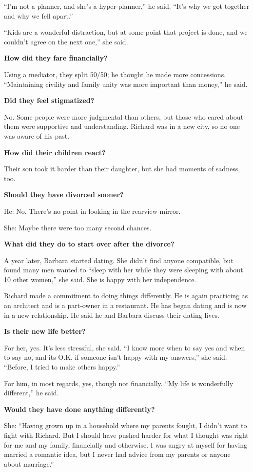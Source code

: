 ``I'm not a planner, and she's a hyper-planner,'' he said. ``It's why we
got together and why we fell apart.''

``Kids are a wonderful distraction, but at some point that project is
done, and we couldn't agree on the next one,'' she said.

\textbf{How did they fare financially?}

Using a mediator, they split 50/50; he thought he made more concessions.
``Maintaining civility and family unity was more important than money,''
he said.

\textbf{Did they feel stigmatized?}

No. Some people were more judgmental than others, but those who cared
about them were supportive and understanding. Richard was in a new city,
so no one was aware of his past.

\textbf{How did their children react?}

Their son took it harder than their daughter, but she had moments of
sadness, too.

\textbf{Should they have divorced sooner?}

He: No. There's no point in looking in the rearview mirror.

She: Maybe there were too many second chances.

\textbf{What did they do to start over after the divorce?}

A year later, Barbara started dating. She didn't find anyone compatible,
but found many men wanted to ``sleep with her while they were sleeping
with about 10 other women,'' she said. She is happy with her
independence.

Richard made a commitment to doing things differently. He is again
practicing as an architect and is a part-owner in a restaurant. He has
began dating and is now in a new relationship. He said he and Barbara
discuss their dating lives.

\textbf{Is their new life better?}

For her, yes. It's less stressful, she said. ``I know more when to say
yes and when to say no, and its O.K. if someone isn't happy with my
answers,'' she said. ``Before, I tried to make others happy.''

For him, in most regards, yes, though not financially. ``My life is
wonderfully different,'' he said.

\textbf{Would they have done anything differently?}

She: ``Having grown up in a household where my parents fought, I didn't
want to fight with Richard. But I should have pushed harder for what I
thought was right for me and my family, financially and otherwise. I was
angry at myself for having married a romantic idea, but I never had
advice from my parents or anyone about marriage.''

